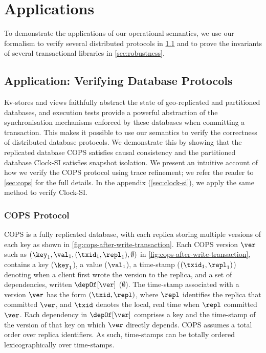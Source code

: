 \section{Applications}
\label{sec:applications}
\label{sec:program-analysis}

To demonstrate the applications of our operational semantics, 
we use our formalism to verify several distributed protocols in \cref{sec:verify-impl} and
to prove the invariants of several transactional libraries in \cref{sec:robustness}.

\subsection{Application: Verifying Database Protocols}
\label{sec:verify-impl}
Kv-stores and views faithfully abstract the state of geo-replicated and partitioned
databases, and  execution tests provide a powerful abstraction of the synchronisation mechanisms 
enforced by these databases when committing a transaction. 
This makes it possible to use our 
semantics to verify the correctness of distributed database protocols. 
We demonstrate this by showing that the replicated database 
COPS \cite{cops} satisfies causal consistency and
the partitioned database Clock-SI \cite{clocksi} satisfies snapshot isolation.
We present an intuitive account of how we verify the COPS protocol using trace refinement;
we refer the reader to \cref{sec:cops} for the full details.
In the appendix (\cref{sec:clock-si}), we apply the same method to verify Clock-SI.



\subsubsection{COPS Protocol} 
COPS is a fully replicated database, with each replica storing multiple versions of each key as shown in \cref{fig:cops-after-write-transaction}. 
Each COPS version \( \ver \)
such as \( (\key_1,\val_1,(\txid_1,\repl_1), \emptyset) \) in \cref{fig:cops-after-write-transaction},
contains a key ($\key_1$), a value ($\val_1$), a time-stamp ($(\txid_1, \repl_1)$) denoting
when a client first wrote the version to the replica, 
and a set of dependencies, written $\depOf[\ver]$ ($\emptyset$). 
The time-stamp associated with a version $\ver$ has the form $(\txid, \repl)$, where $\repl$ identifies the replica that committed $\ver$, and $\txid$ denotes the local, real time when $\repl$ committed $\ver$. 
Each dependency in $\depOf[\ver]$ comprises a key and the time-stamp of the version of that key on which $\ver$ directly depends.  
COPS assumes a total order over replica identifiers. As such, time-stamps can be
totally ordered lexicographically over time-stamps. 


